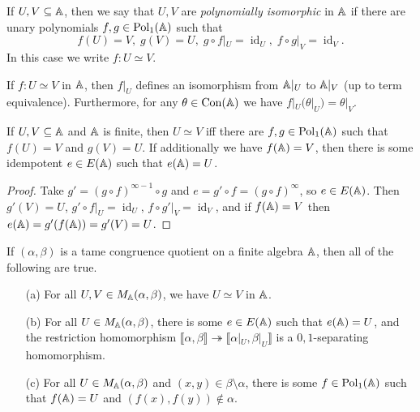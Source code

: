 \begin{appendices}
\begin{defn} If $U,V \subseteq \mathbb{A}$, then we say that $U,V$ are \emph{polynomially isomorphic} in $\mathbb{A}$ if there are unary polynomials $f,g \in \operatorname{Pol}_1(\mathbb{A})$ such that
\[
f(U) = V, \; g(V) = U, \; g\circ f|_U = \operatorname{id}_U, \; f\circ g|_V = \operatorname{id}_V.
\]
In this case we write $f : U \simeq V$.
\end{defn}

\begin{prop} If $f : U \simeq V$ in $\mathbb{A}$, then $f|_U$ defines an isomorphism from $\mathbb{A}|_U$ to $\mathbb{A}|_V$ (up to term equivalence). Furthermore, for any $\theta \in \operatorname{Con}(\mathbb{A})$ we have $f|_U(\theta|_U) = \theta|_V$.
\end{prop}

\begin{prop} If $U,V \subseteq \mathbb{A}$ and $\mathbb{A}$ is finite, then $U \simeq V$ iff there are $f, g \in \operatorname{Pol}_1(\mathbb{A})$ such that $f(U) = V$ and $g(V) = U$. If additionally we have $f(\mathbb{A}) = V$, then there is some idempotent $e \in E(\mathbb{A})$ such that $e(\mathbb{A}) = U$.
\end{prop}
\begin{proof} Take $g' = (g \circ f)^{\infty - 1}\circ g$ and $e = g' \circ f = (g \circ f)^{\infty}$, so $e \in E(\mathbb{A})$. Then $g'(V) = U$, $g'\circ f|_U = \operatorname{id}_U$, $f\circ g'|_V = \operatorname{id}_V$, and if $f(\mathbb{A}) = V$ then $e(\mathbb{A}) = g'(f(\mathbb{A})) = g'(V) = U$.
\end{proof}

\begin{thm}\label{thm-minimal-sets} If $(\alpha,\beta)$ is a tame congruence quotient on a finite algebra $\mathbb{A}$, then all of the following are true.
\begin{itemize}
\item[(a)] For all $U,V \in M_{\mathbb{A}}(\alpha,\beta)$, we have $U \simeq V$ in $\mathbb{A}$.

\item[(b)] For all $U \in M_{\mathbb{A}}(\alpha,\beta)$, there is some $e \in E(\mathbb{A})$ such that $e(\mathbb{A}) = U$, and the restriction homomorphism $\llbracket \alpha, \beta \rrbracket \twoheadrightarrow \llbracket \alpha|_U, \beta|_U \rrbracket$ is a $0,1$-separating homomorphism.

\item[(c)] For all $U \in M_{\mathbb{A}}(\alpha, \beta)$ and $(x,y) \in \beta\setminus\alpha$, there is some $f \in \operatorname{Pol}_1(\mathbb{A})$ such that $f(\mathbb{A}) = U$ and $(f(x),f(y)) \not\in \alpha$.


\end{itemize}
\end{thm}
\end{appendices}
